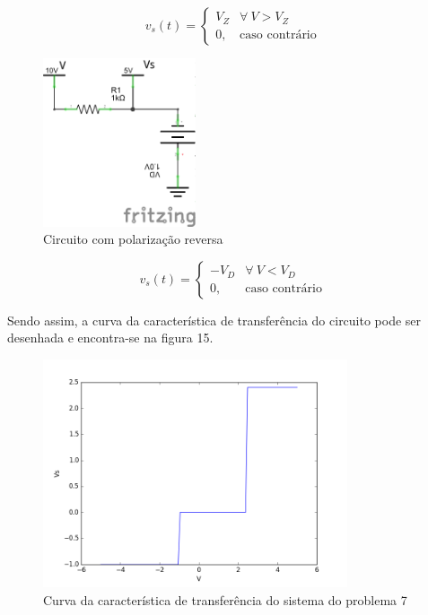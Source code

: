 \documentclass[12pt, a4paper, twoside]{article}
\begin{document}
\begin{equation}
    v_s(t) =
    \begin{cases}
        V_Z & \forall\ V > V_Z \\
        0, & \text{caso contrário}
    \end{cases}
\end{equation}

\begin{figure}[H]
    \centering
    \includegraphics[width=0.4\textwidth]{figs/rel3/c4-2.png}
    \caption{Circuito com polarização reversa}
\end{figure}

\begin{equation}
    v_s(t) =
    \begin{cases}
        -V_D & \forall\ V < V_D \\
        0, & \text{caso contrário}
    \end{cases}
\end{equation}

Sendo assim, a curva da característica de transferência do circuito pode ser desenhada
e encontra-se na figura 15.
\begin{figure}[H]
    \centering
    \includegraphics[width=0.8\textwidth]{figs/rel3/ex7.png}
    \caption{Curva da característica de transferência do sistema do problema 7}
\end{figure}
\end{document}
